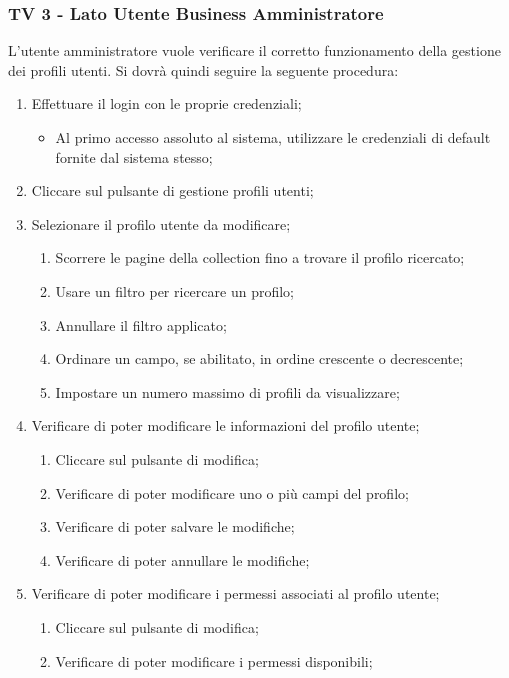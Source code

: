 \subsubsection{TV 3 - Lato Utente Business Amministratore}

L’utente amministratore vuole verificare il corretto funzionamento della gestione dei profili utenti.
Si dovrà quindi seguire la seguente procedura:

\begin{enumerate}
\item Effettuare il login con le proprie credenziali;
\begin{itemize}
\item Al primo accesso assoluto al sistema, utilizzare le credenziali di default fornite dal sistema stesso;
\end{itemize}
\item Cliccare sul pulsante di gestione profili utenti;
\item Selezionare il profilo utente da modificare;
\begin{enumerate}
\item Scorrere le pagine della collection fino a trovare il profilo ricercato;
\item Usare un filtro per ricercare un profilo;
\item Annullare il filtro applicato;
\item Ordinare un campo, se abilitato, in ordine crescente o decrescente;
\item Impostare un numero massimo di profili da visualizzare;
\end{enumerate}
\item Verificare di poter modificare le informazioni del profilo utente;
\begin{enumerate}
\item Cliccare sul pulsante di modifica;
\item Verificare di poter modificare uno o più campi del profilo;
\item Verificare di poter salvare le modifiche;
\item Verificare di poter annullare le modifiche;
\end{enumerate}
\item Verificare di poter modificare i permessi associati al profilo utente;
\begin{enumerate}
\item Cliccare sul pulsante di modifica;
\item Verificare di poter modificare i permessi disponibili;

\end{enumerate}
\end{enumerate}
